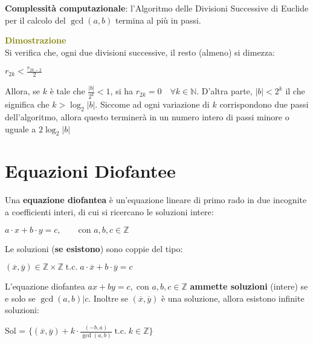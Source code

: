 \textbf{Complessità computazionale}: l'Algoritmo delle Divisioni Successive di Euclide per il calcolo del $\gcd (a, b)$ termina al più in  passi.
\begin{boxA}
    \textcolor{olive}{\textbf{Dimostrazione}} \\
    Si verifica che, ogni due divisioni successive, il resto (almeno) si dimezza: 
    
    {\centering
        $r_{2k} < \frac{r_{2k - 2}}{2}$
    \par}
    Allora, se $k$ è tale che $\frac{|b|}{2^k} < 1$, si ha $r_{2k} = 0 \quad \forall k \in \mathbb{N}$. D'altra parte, $|b| < 2^k$ il che significa che $k > \log_2 |b|$. Siccome ad ogni variazione di $k$ corrispondono due passi dell'algoritmo, allora questo terminerà in un numero intero di passi minore o uguale a $2\log_2 |b|$
\end{boxA}

\newpage
\section{Equazioni Diofantee}
Una \textbf{equazione diofantea} è un'equazione lineare di primo rado in due incognite a coefficienti interi, di cui si ricercano le soluzioni intere:

{\centering
    $a \cdot x + b \cdot y = c, \qquad \text{con } a, b, c \in \mathbb{Z}$
\par}

\begin{flushleft}
    Le soluzioni (\textbf{se esistono}) sono coppie del tipo:

    {\centering
        $(\overline{x}, \overline{y}) \in \mathbb{Z} \times \mathbb{Z} \; \text{t.c.} \; a \cdot \overline{x} + b \cdot \overline{y} = c$
    \par}
\end{flushleft}
\begin{flushleft}
    L'equazione diofantea $ax + by = c, \; \text{con } a, b, c \in \mathbb{Z}$ \textbf{ammette soluzioni} (intere) se e solo se $\gcd (a, b)| c$. Inoltre se $(\overline{x}, \overline{y})$ è una soluzione, allora esistono infinite soluzioni:

    {\centering
        Sol = $\{(\overline{x}, \overline{y}) + k \cdot \frac{(-b, a)}{\gcd (a, b)} \; \text{t.c.} \; k \in \mathbb{Z}\}$
    \par}
\end{flushleft}

